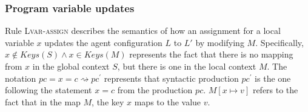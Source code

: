 \subsubsection{Program variable updates}
Rule \textsc{Lvar-assign} describes the semantics of how an assignment for a local variable $x$ updates the agent configuration $L$ to $L'$ by modifying $M$. Specifically, $x\notin \mathit{Keys}(S) \wedge x \in \mathit{Keys(M)}$ represents the fact that there is no mapping from $x$ in the global context $S$, but there is one in the local context $M$. The notation $\mathit{pc} = x = c \rightsquigarrow \mathit{pc}^\prime$ represents that syntactic production $\mathit{pc}^\prime$ is the one following the statement $x = c$ from the production $\mathit{pc}$. $M[x\mapsto v]$ refers to the fact that in the map $M$, the key $x$ maps to the value $v$. 

\begin{mdframed}
\scriptsize
{}
\end{mdframed}

\noindent
